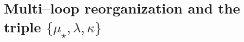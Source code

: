 \documentclass[aps,prd,onecolumn,amsmath,amssymb,superscriptaddress,nofootinbib,showpacs,showkeys]{revtex4-2}
\begin{document}
%
%




\section{Multi\texorpdfstring{--}{--}loop reorganization and the triple \texorpdfstring{$\{\mu_\star,\lambda,\kappa\}$}{\{mu*,lambda,kappa\}}}  \label{app:B}
\end{document}
